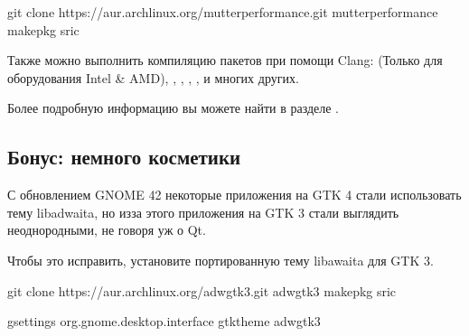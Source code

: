 \documentclass[letterpaper,10pt,russian,openany]{sphinxmanual}
\begin{document}
\sphinxAtStartPar
{}

\begin{sphinxVerbatim}[commandchars=\\\{\}]
git clone https://aur.archlinux.org/mutter\PYGZhy{}performance.git 
 mutter\PYGZhy{}performance                                      
makepkg \PYGZhy{}sric                                              
\end{sphinxVerbatim}

\sphinxAtStartPar
Также можно выполнить компиляцию пакетов при помощи Clang:  (Только для оборудования Intel \& AMD),
, ,
, ,
 и многих других.

\sphinxAtStartPar
Более подробную информацию вы можете найти в разделе .

\ignorespaces 

\subsection{Бонус: немного косметики}
\label{\detokenize{source/de-optimizations:gnome-cosmetics}}\label{\detokenize{source/de-optimizations:index-6}}\label{\detokenize{source/de-optimizations:id2}}
\sphinxAtStartPar
С обновлением GNOME 42 некоторые приложения на GTK 4 стали использовать тему libadwaita, но из\sphinxhyphen{}за этого
приложения на GTK 3 стали выглядить неоднородными, не говоря уж о Qt.

\sphinxAtStartPar
Чтобы это исправить, установите портированную тему libawaita для GTK 3.

\sphinxAtStartPar
{}

\begin{sphinxVerbatim}[commandchars=\\\{\}]
git clone https://aur.archlinux.org/adw\PYGZhy{}gtk3.git 
 adw\PYGZhy{}gtk3                                      
makepkg \PYGZhy{}sric                                    

gsettings  org.gnome.desktop.interface gtk\PYGZhy{}theme adw\PYGZhy{}gtk3
\end{sphinxVerbatim}
\end{document}

